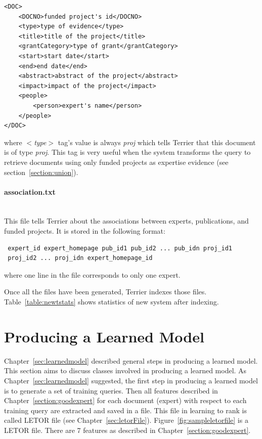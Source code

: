 \begin{Verbatim}
<DOC>
	<DOCNO>funded project's id</DOCNO>
	<type>type of evidence</type>
	<title>title of the project</title>
	<grantCategory>type of grant</grantCategory>
	<start>start date</start>
	<end>end date</end>
	<abstract>abstract of the project</abstract>
	<impact>impact of the project</impact>
	<people>
		<person>expert's name</person>
	</people>
</DOC>

\end{Verbatim}
where \textit{$<$type$>$} tag's value is always \textit{proj} which tells Terrier that this document is of type \textit{proj}. This tag is very useful when 
the system transforms the query to retrieve documents using only funded projects as expertise evidence (see section~\ref{section:union}).

\paragraph{association.txt} \hspace{0pt} \\
This file tells Terrier about the associations between experts, publications, and funded projects. It is stored in the following format:
\begin{verbatim}
 expert_id expert_homepage pub_id1 pub_id2 ... pub_idn proj_id1 
 proj_id2 ... proj_idn expert_homepage_id
\end{verbatim}
where one line in the file corresponds to only one expert.

Once all the files have been generated, Terrier indexes those files. Table~\ref{table:newtstats} shows statistics of new system after indexing.

\begin{table}
\centering
{}
\caption{Statistics of New System After Indexing Process} \label{table:newtstats}
\end{table}

\section{Producing a Learned Model}\label{section:producelearnedmodel}
Chapter~\ref{sec:learnedmodel} described general steps in producing a learned model. This section aims to discuss classes involved in producing a learned model.
As Chapter~\ref{sec:learnedmodel} suggested, the first step in producing a learned model is to generate a set of training queries. 
Then all features described in Chapter~\ref{section:goodexpert} for each document (expert) with respect to each training query are extracted and saved
in a file. This file in learning to rank is called LETOR file (see Chapter~\ref{sec:letorFile}).
Figure~\ref{fig:sampleletorfile} is a LETOR file. There are 7 features as described in Chapter~\ref{section:goodexpert}.

